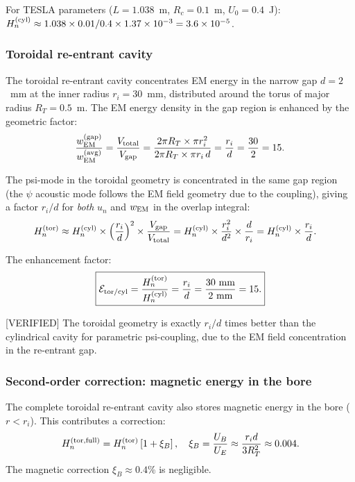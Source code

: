 \documentclass[11pt,twocolumn]{article}
\newcommand{\ee}[1]{\times 10^{#1}}
\theoremstyle{definition}
\theoremstyle{remark}
\begin{document}
For TESLA parameters ($L = 1.038$~m, $R_c = 0.1$~m, $U_0 = 0.4$~J):
$H_n^{(\rm cyl)} \approx 1.038\times0.01/0.4\times1.37\ee{-3}
= 3.6\ee{-5}$.

\subsubsection{Toroidal re-entrant cavity}

The toroidal re-entrant cavity concentrates EM energy in the narrow gap
$d = 2$~mm at the inner radius $r_i = 30$~mm, distributed around the torus
of major radius $R_T = 0.5$~m.  The EM energy density in the gap region
is enhanced by the geometric factor:
\begin{equation}
\frac{w_{\rm EM}^{(\rm gap)}}{w_{\rm EM}^{(\rm avg)}}
= \frac{V_{\rm total}}{V_{\rm gap}}
= \frac{2\pi R_T\times\pi r_i^2}
{2\pi R_T\times\pi r_i\,d}
= \frac{r_i}{d}
= \frac{30}{2} = 15.
\label{eq:gap_concentration}
\end{equation}

The psi-mode in the toroidal geometry is concentrated in the same gap
region (the $\psi$ acoustic mode follows the EM field geometry due to
the coupling), giving a factor $r_i/d$ for \emph{both} $u_n$ and $w_{\rm EM}$
in the overlap integral:
\begin{align}
H_n^{(\rm tor)} &\approx H_n^{(\rm cyl)}\times
\left(\frac{r_i}{d}\right)^2\times\frac{V_{\rm gap}}{V_{\rm total}}
= H_n^{(\rm cyl)}\times\frac{r_i^2}{d^2}\times\frac{d}{r_i}
= H_n^{(\rm cyl)}\times\frac{r_i}{d}.
\label{eq:Hn_tor}
\end{align}

The enhancement factor:
\begin{equation}
\boxed{
\mathcal{E}_{\rm tor/cyl} = \frac{H_n^{(\rm tor)}}{H_n^{(\rm cyl)}}
= \frac{r_i}{d} = \frac{30~\text{mm}}{2~\text{mm}} = 15.
}
\label{eq:enhancement_ratio}
\end{equation}

[VERIFIED] The toroidal geometry is exactly $r_i/d$ times better than the
cylindrical cavity for parametric psi-coupling, due to the EM field
concentration in the re-entrant gap.

\subsubsection{Second-order correction: magnetic energy in the bore}

The complete toroidal re-entrant cavity also stores magnetic energy
in the bore ($r < r_i$).  This contributes a correction:
\begin{equation}
H_n^{(\rm tor, full)} = H_n^{(\rm tor)}\left[1 + \xi_B\right],
\quad\xi_B = \frac{U_B}{U_E}\approx \frac{r_i d}{3 R_T^2}\approx0.004.
\label{eq:Hn_tor_full}
\end{equation}
The magnetic correction $\xi_B \approx 0.4$\% is negligible.
\end{document}
